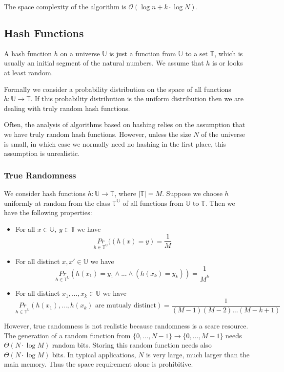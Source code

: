 \documentclass[english]{panikzettel}
\begin{document}
The space complexity of the algorithm is $\mathcal{O}(\log n + k\cdot \log N)$.

\subsection{Hash Functions}
A hash function $h$ on a universe $\mathbb{U}$ is just a function from $\mathbb{U}$ to a set $\mathbb{T}$, which is usually an initial segment of the natural numbers. We assume that $h$ is or looks at least random.

Formally we consider a probability distribution on the space of all functions $h:\mathbb{U}\to\mathbb{T}$. If this probability distribution is the uniform distribution then we are dealing with truly random hash functions.

Often, the analysis of algorithms based on hashing relies on the assumption that we have truly random hash functions. However, unless the size $N$ of the universe is small, in which case we normally need no hashing in the first place, this assumption is unrealistic.

%

\subsubsection{True Randomness}
We consider hash functions $h:\mathbb{U}\to \mathbb{T}$, where $|\mathbb{T}|=M$. Suppose we choose $h$ uniformly at random from the class $\mathbb{T}^\mathbb{U}$ of all functions from $\mathbb{U}$ to $\mathbb{T}$. Then we have the following properties:
\begin{itemize}
\item For all $x\in\mathbb{U}, \ y\in \mathbb{T}$ we have
\[
\underset{h\in\mathbb{T}^\mathbb{U}}{Pr}((h(x)=y)=\frac{1}{M}
\]
\item For all distinct $x,x'\in\mathbb{U}$ we have
\[
\underset{h\in\mathbb{T}^\mathbb{U}}{Pr}(h(x_1)=y_1 \wedge ... \wedge (h(x_k)=y_k))=\frac{1}{M^k}
\]
\item For all distinct $x_1,...,x_k\in\mathbb{U}$ we have
\[
\underset{h\in\mathbb{T}^\mathbb{U}}{Pr}(h(x_1),...,h(x_k) \text{ are mutualy distinct})=\frac{1}{(M-1)(M-2)...(M-k+1)}
\]
\end{itemize}
However, true randomness is not realistic because randomness is a scare resource. The generation of a random function from $\{0,...,N-1 \} \to \{0,...,M-1 \}$ needs $\Theta(N\cdot \log M)$ random bits. Storing this random function needs also $\Theta(N\cdot \log M)$ bits. In typical applications, $N$ is very large, much larger than the main memory. Thus the space requirement alone is prohibitive.
\end{document}
